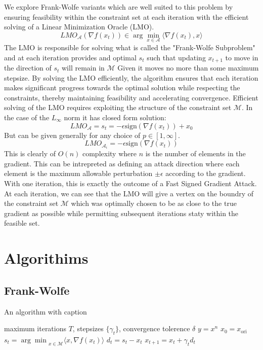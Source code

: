 \documentclass{article}
\begin{document}
We explore Frank-Wolfe variants which are well suited to this problem by ensuring feasibility within the constraint set at each iteration with the efficient solving of a Linear Minimization Oracle (LMO). 
$$
LMO_\mathcal{A}(\nabla f(x_t)) \in \arg \min_{x \in \mathcal{A}} \langle \nabla f(x_t), x\rangle
$$
The LMO is responsible for solving what is called the "Frank-Wolfe Subproblem" and at each iteration provides and optimal $s_t$ such that updating $x_{t+1}$ to move in the direction of $s_t$ will remain in $\mathcal{M}$ Given it moves no more than some maximum stepsize. By solving the LMO efficiently, the algorithm ensures that each iteration makes significant progress towards the optimal solution while respecting the constraints, thereby maintaining feasibility and accelerating convergence. 
Efficient solving of the LMO requires exploiting the structure of the constraint set $\mathcal{M}$. In the case of the $L_\infty$ norm it has closed form solution:
$$LMO_\mathcal{A} = s_t = -\epsilon \text{sign}(\nabla f(x_t)) + x_0$$
But can be given generally for any choice of $p \in [1, \infty]$.
$$LMO_\mathcal{A}_i = -\epsilon \text{sign}(\nabla f(x_t))$$
This is clearly of $O(n)$ complexity where $n$ is the number of elements in the gradient. This can be intrepreted as defining an attack direction where each element is the maximum allowable perturbation $\pm \epsilon$ according to the gradient. With one iteration, this is exactly the outcome of a Fast Signed Gradient Attack. At each iteration, we can see that the LMO will give a vertex on the boundry of the constraint set $\mathcal{M}$ which was optimally chosen to be as close to the true gradient as possible while permitting subsequent iterations staty within the feasible set.



\section{Algorithims}
\subsection{Frank-Wolfe}
\begin{algorithm}
\caption{An algorithm with caption}\label{alg:cap}
\begin{algorithmic}[1]
\Require maximum iterations $T$, stepsizes $\{\gamma_t\}$, convergence tolerence $\delta$
\Ensure $y = x^n$
\State $x_0 = x_{\text{ori}}$
	\State $s_t = {\arg \min}_{x\in\mathcal{M}} \langle x, \nabla f(x_t)\rangle$ 
	\State $d_t = s_t - x_t$
	\State $x_{t+1} = x_t + \gamma_t d_t$
	  \hfill {}
	\EndIf
\EndFor
\end{algorithmic}
\end{algorithm}
\end{document}
